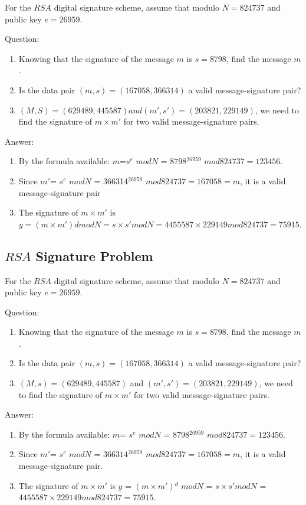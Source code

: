 \documentclass[paper=a4, fontsize=11pt]{scrartcl} %
\numberwithin{equation}{section} %
\numberwithin{figure}{section} %
\numberwithin{table}{section} %
\begin{document}
For the $RSA$ digital signature scheme, assume that modulo $N = 824737$ and public key $e = 26959$.

Question:
\begin{enumerate}
\item Knowing that the signature of the message $m$ is $s = 8798$, find the message $m$.
\item Is the data pair $(m, s) = (167058, 366314)$ a valid message-signature pair?
\item $(M,S) = (629489, 445587) and (m', s') = (203821,229149)$, we need to find the signature of $m \times m'$ for two valid message-signature pairs.
\end{enumerate}

Answer:
\begin{enumerate}
\item By the formula available: $m$=$s^e$ $mod N$ = $8798$$^{26959}$ $mod 824737 = 123456$.
\item Since $m'$= $s^e$ $mod N$ = 366314$^{26959}$ $mod 824737 = 167058 = m$, it is a valid message-signature pair
\item The signature of $m \times m'$ is $y = (m \times m') d mod N = s \times s' mod N = 4455587 \times 229149 mod 824737 = 75915$.
\end{enumerate}


\subsection{$RSA$ Signature Problem \uppercase\expandafter{}}

For the $RSA$ digital signature scheme, assume that modulo $N = 824737$ and public key $e = 26959$.

Question:

\begin{enumerate}
\item Knowing that the signature of the message $m$ is $s = 8798$, find the message $m$.
\item Is the data pair $(m, s) = (167058, 366314)$ a valid message-signature pair?
\item $(M, s) = (629489, 445587)$ and $(m', s') = (203821,229149)$, we need to find the signature of $m \times m'$ for two valid message-signature pairs.
\end{enumerate}

Answer:
\begin{enumerate}
\item By the formula available: $m$= $s^e$ $mod N$ = $8798$$^{26959}$ $mod 824737 = 123456$.
\item Since $m'$= $s^e$ $mod N$ = $366314$$^{26959}$ $mod 824737 = 167058 = m$, it is a valid message-signature pair.
\item The signature of $m \times m'$ is $y$ = $(m \times m')$$^ d$ $mod N$ = $s \times s' mod N$ = $4455587 \times 229149 mod 824737 = 75915$.
\end{enumerate}
\end{document}
